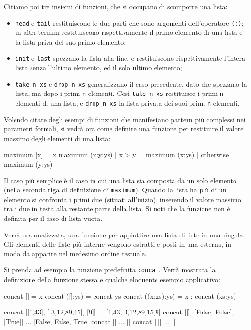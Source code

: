 Citiamo poi tre insiemi di funzioni, che si occupano di scomporre una 
lista:
\begin{itemize}
    \item \verb"head" e \verb"tail" restituiscono le due parti che sono 
    argomenti dell'operatore \verb"(:)"; in altri termini restituiscono 
    rispettivamente il primo elemento di una lista e la lista priva del suo 
    primo elemento;
    
    \item \verb"init" e \verb"last" spezzano la lista alla fine, e 
    restituiscono rispettivamente l'intera lista senza l'ultimo elemento, ed 
    il solo ultimo elemento;
    
    \item \verb"take n xs" e \verb"drop n xs" generalizzano il caso 
    precedente, dato che spezzano la lista, ma dopo i primi \verb"n" elementi. 
    Cos\`i \verb"take n xs" restituisce i primi \verb"n" elementi di una 
    lista, e \verb"drop n xs" la lista privata dei suoi primi \verb"n" 
    elementi.
\end{itemize}

Volendo citare degli esempi di funzioni che manifestano pattern pi\`u 
complessi nei parametri formali, si vedr\`a ora come definire una funzione per 
restituire il valore massimo degli elementi di una lista:
\begin{haskellCode}
maximum [x]                   = x
maximum (x:y:ys) | x > y      = maximum (x:ys)
	         | otherwise  = maximum (y:ys)
\end{haskellCode}
Il caso pi\`u semplice \`e il caso in cui una lista sia composta da un solo elemento  (nella 
seconda riga di definizione di \verb"maximum"). Quando la lista ha pi\`u di 
un elemento si confronta i primi due (situati all'inizio), inserendo il valore massimo tra i due in testa alla 
restante parte della lista. Si noti che la funzione 
non \`e definita per il caso di lista vuota.

Verr\`a ora analizzata, una funzione per appiattire una lista di liste in una singola. 
Gli elementi delle liste pi\`u interne vengono estratti e posti 
in una esterna, in modo da apparire nel medesimo ordine testuale. 


Si prenda ad esempio la funzione predefinita \lstinline{concat}. Verr\`{a} mostrata la 
definizione della funzione stessa e qualche eloquente esempio applicativo:
\begin{haskellCode}
concat []                   = x
concat ([]:ys)              = concat ys
concat ((x:xs):ys)          = x : concat (xs:ys)
\end{haskellCode}
\begin{haskellCode}
concat [[1,43], [-3,12,89,15], [9]] ... [1,43,-3,12,89,15,9]
concat [[], [False, False], [True]] ... [False, False, True]
concat []                           ... []
concat [[]]                         ... []
\end{haskellCode}

